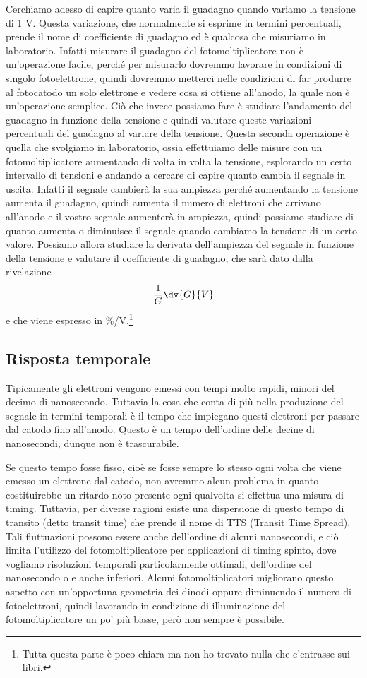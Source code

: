 \vspace{0.2cm}Cerchiamo adesso di capire quanto varia il guadagno quando variamo la tensione di 1 V. Questa variazione, che normalmente si esprime in termini percentuali, prende il nome di coefficiente di guadagno ed è qualcosa che misuriamo in laboratorio. Infatti misurare il guadagno del fotomoltiplicatore non è un'operazione facile, perché per misurarlo dovremmo lavorare in condizioni di singolo fotoelettrone, quindi dovremmo metterci nelle condizioni di far produrre al fotocatodo un solo elettrone e vedere cosa si ottiene all'anodo, la quale non è un'operazione semplice. Ciò che invece possiamo fare è studiare l'andamento del guadagno in funzione della tensione e quindi valutare queste variazioni percentuali del guadagno al variare della tensione. Questa seconda operazione è quella che svolgiamo in laboratorio, ossia effettuiamo delle misure con un fotomoltiplicatore aumentando di volta in volta la tensione, esplorando un certo intervallo di tensioni e andando a cercare di capire quanto cambia il segnale in uscita. Infatti il segnale cambierà la sua ampiezza perché aumentando la tensione aumenta il guadagno, quindi aumenta il numero di elettroni che arrivano all'anodo e il vostro segnale aumenterà in ampiezza, quindi possiamo studiare di quanto aumenta o diminuisce il segnale quando cambiamo la tensione di un certo valore. Possiamo allora studiare la derivata dell'ampiezza del segnale in funzione della tensione e valutare il coefficiente di guadagno, che sarà dato dalla rivelazione
\begin{equation*}
   \frac{1}{G}\dv{G}{V}
\end{equation*}
e che viene espresso in \%/V.\footnote{Tutta questa parte è poco chiara ma non ho trovato nulla che c'entrasse sui libri.}

\subsection{Risposta temporale}
Tipicamente gli elettroni vengono emessi con tempi molto rapidi, minori del decimo di nanosecondo. Tuttavia la cosa che conta di più nella produzione del segnale in termini temporali è il tempo che impiegano questi elettroni per passare dal catodo fino all'anodo. Questo è un tempo dell'ordine delle decine di nanosecondi, dunque non è trascurabile.

Se questo tempo fosse fisso, cioè se fosse sempre lo stesso ogni volta che viene emesso un elettrone dal catodo, non avremmo alcun problema in quanto costituirebbe un ritardo noto presente ogni qualvolta si effettua una misura di timing. Tuttavia, per diverse ragioni esiste una dispersione di questo tempo di transito (detto transit time) che prende il nome di TTS (Transit Time Spread). Tali fluttuazioni possono essere anche dell'ordine di alcuni nanosecondi, e ciò limita l'utilizzo del fotomoltiplicatore per applicazioni di timing spinto, dove vogliamo risoluzioni temporali particolarmente ottimali, dell'ordine del nanosecondo o e anche inferiori. Alcuni fotomoltiplicatori migliorano questo aspetto con un'opportuna geometria dei dinodi oppure diminuendo il numero di fotoelettroni, quindi lavorando in condizione di illuminazione del fotomoltiplicatore un po' più basse, però non sempre è possibile. 


